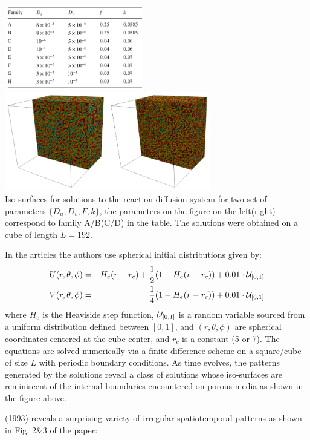 \begin{center}
\includegraphics[width=6cm]{python_codes/fieldstone_171/images/gama01}
\includegraphics[width=9cm]{python_codes/fieldstone_171/images/gama02}\\
{\captionfont Iso-surfaces for solutions to the reaction-diffusion system 
for two set of parameters $\{D_u,D_v,F,k\}$, the parameters on the figure on 
the left(right) correspond to family A/B(C/D) in the table. The solutions were
obtained on a cube of length $L=192$.}
\end{center}

In the articles the authors use spherical initial distributions given by:
\begin{eqnarray}
U(r,\theta,\phi) &=& H_e(r-r_c) +\frac12 (1-H_e(r-r_c)) + 0.01 \cdot {\cal U}_{[0,1]} \nonumber\\
V(r,\theta,\phi) &=& \frac14 (1-H_e(r-r_c)) + 0.01 \cdot {\cal U}_{[0,1]}
\end{eqnarray}
where $H_e$ is the Heaviside step function, ${\cal U}_{[0,1]}$ is a random variable sourced from a 
uniform distribution defined between $[0,1]$, and $(r,\theta,\phi)$ are spherical coordinates centered at
the cube center, and $r_c$ is a constant (5 or 7).
The equations are solved numerically via a finite difference scheme on a square/cube of size $L$
with periodic boundary conditions. As time evolves, the patterns generated by
the solutions reveal a class of solutions whose iso-surfaces are reminiscent of the internal
boundaries encountered on porous media as shown in the figure above.



\textcite{pear93} (1993) reveals a surprising variety of irregular spatiotemporal patterns
as shown in Fig. 2\&3 of the paper:

